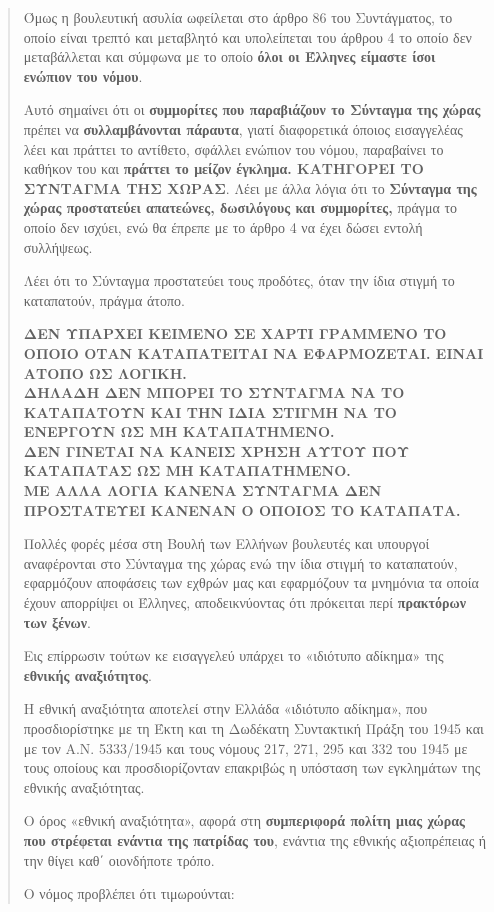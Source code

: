 \documentclass[a4paper]{article}
\begin{document}
\begin{itemize}
\begin{quote}
Όμως η βουλευτική ασυλία ωφείλεται στο άρθρο 86 του Συντάγματος, το οποίο είναι τρεπτό και μεταβλητό και υπολείπεται του άρθρου 4 το οποίο δεν μεταβάλλεται και σύμφωνα με το οποίο \textbf{όλοι οι Έλληνες είμαστε ίσοι ενώπιον του νόμου}. 

Αυτό σημαίνει ότι οι \textbf{συμμορίτες που παραβιάζουν το Σύνταγμα της χώρας} πρέπει να \textbf{συλλαμβάνονται πάραυτα}, γιατί διαφορετικά όποιος εισαγγελέας λέει και πράττει το αντίθετο, σφάλλει ενώπιον του νόμου, παραβαίνει το καθήκον του και \textbf{πράττει το μείζον έγκλημα. ΚΑΤΗΓΟΡΕΙ ΤΟ ΣΥΝΤΑΓΜΑ ΤΗΣ ΧΩΡΑΣ}. Λέει με άλλα λόγια ότι το \textbf{Σύνταγμα της χώρας προστατεύει απατεώνες, δωσιλόγους και συμμορίτες,} πράγμα το οποίο δεν ισχύει, ενώ θα έπρεπε με το άρθρο 4 να έχει δώσει εντολή συλλήψεως. 

Λέει ότι το Σύνταγμα προστατεύει τους προδότες, όταν την ίδια στιγμή το καταπατούν, πράγμα άτοπο.

\textbf{ΔΕΝ ΥΠΑΡΧΕΙ ΚΕΙΜΕΝΟ ΣΕ ΧΑΡΤΙ ΓΡΑΜΜΕΝΟ ΤΟ ΟΠΟΙΟ ΟΤΑΝ ΚΑΤΑΠΑΤΕΙΤΑΙ ΝΑ ΕΦΑΡΜΟΖΕΤΑΙ. ΕΙΝΑΙ ΑΤΟΠΟ ΩΣ ΛΟΓΙΚΗ. \\ ΔΗΛΑΔΗ ΔΕΝ ΜΠΟΡΕΙ ΤΟ ΣΥΝΤΑΓΜΑ ΝΑ ΤΟ ΚΑΤΑΠΑΤΟΥΝ ΚΑΙ ΤΗΝ ΙΔΙΑ ΣΤΙΓΜΗ ΝΑ ΤΟ ΕΝΕΡΓΟΥΝ ΩΣ ΜΗ ΚΑΤΑΠΑΤΗΜΕΝΟ. \\ ΔΕΝ ΓΙΝΕΤΑΙ ΝΑ ΚΑΝΕΙΣ ΧΡΗΣΗ ΑΥΤΟΥ ΠΟΥ ΚΑΤΑΠΑΤΑΣ ΩΣ ΜΗ ΚΑΤΑΠΑΤΗΜΕΝΟ. \\ ΜΕ ΑΛΛΑ ΛΟΓΙΑ ΚΑΝΕΝΑ ΣΥΝΤΑΓΜΑ ΔΕΝ ΠΡΟΣΤΑΤΕΥΕΙ ΚΑΝΕΝΑΝ Ο ΟΠΟΙΟΣ ΤΟ ΚΑΤΑΠΑΤΑ. }

Πολλές φορές μέσα στη Βουλή των Ελλήνων βουλευτές και υπουργοί αναφέρονται στο Σύνταγμα της χώρας ενώ την ίδια στιγμή το καταπατούν, εφαρμόζουν αποφάσεις των εχθρών μας και εφαρμόζουν τα μνημόνια τα οποία έχουν απορρίψει οι Έλληνες, αποδεικνύοντας ότι πρόκειται περί \textbf{πρακτόρων των ξένων}.

Εις επίρρωσιν τούτων κε εισαγγελεύ υπάρχει το «ιδιότυπο αδίκημα» της \textbf{εθνικής αναξιότητος}.

Η εθνική αναξιότητα αποτελεί στην Ελλάδα «ιδιότυπο αδίκημα», που προσδιορίστηκε με τη Έκτη και τη Δωδέκατη Συντακτική Πράξη του 1945 και με τον Α.Ν. 5333/1945 και τους νόμους 217, 271, 295 και 332 του 1945 με τους οποίους και προσδιορίζονταν επακριβώς η υπόσταση των εγκλημάτων της εθνικής αναξιότητας.

Ο όρος «εθνική αναξιότητα», αφορά στη \textbf{συμπεριφορά πολίτη μιας χώρας που στρέφεται ενάντια της πατρίδας του}, ενάντια της εθνικής αξιοπρέπειας ή την θίγει καθ΄ οιονδήποτε τρόπο.

Ο νόμος προβλέπει ότι τιμωρούνται:


\end{quote}
\end{itemize}
\end{document}
